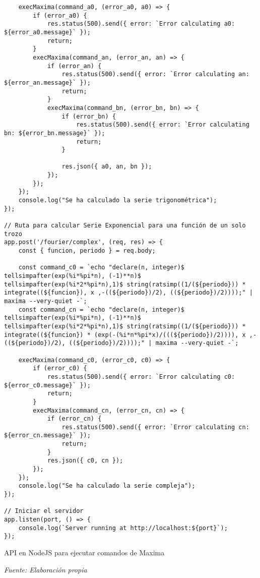 \begin{longlisting}
\begin{verbatim}
	execMaxima(command_a0, (error_a0, a0) => {
		if (error_a0) {
			res.status(500).send({ error: `Error calculating a0: ${error_a0.message}` });
			return;
		}
		execMaxima(command_an, (error_an, an) => {
			if (error_an) {
				res.status(500).send({ error: `Error calculating an: ${error_an.message}` });
				return;
			}
			execMaxima(command_bn, (error_bn, bn) => {
				if (error_bn) {
					res.status(500).send({ error: `Error calculating bn: ${error_bn.message}` });
					return;
				}
				
				res.json({ a0, an, bn });
			});
		});
	});
	console.log("Se ha calculado la serie trigonométrica");
});

// Ruta para calcular Serie Exponencial para una función de un solo trozo
app.post('/fourier/complex', (req, res) => {
	const { funcion, periodo } = req.body;
	
	const command_c0 = `echo "declare(n, integer)$ tellsimpafter(exp(%i*%pi*n), (-1)**n)$ tellsimpafter(exp(%i*2*%pi*n),1)$ string(ratsimp((1/(${periodo})) * integrate((${funcion}), x ,-((${periodo})/2), ((${periodo})/2))));" | maxima --very-quiet -`;
	const command_cn = `echo "declare(n, integer)$ tellsimpafter(exp(%i*%pi*n), (-1)**n)$ tellsimpafter(exp(%i*2*%pi*n),1)$ string(ratsimp((1/(${periodo})) * integrate((${funcion}) * (exp(-(%i*n*%pi*x)/(((${periodo})/2)))), x ,-((${periodo})/2), ((${periodo})/2))));" | maxima --very-quiet -`;
	
	execMaxima(command_c0, (error_c0, c0) => {
		if (error_c0) {
			res.status(500).send({ error: `Error calculating c0: ${error_c0.message}` });
			return;
		}
		execMaxima(command_cn, (error_cn, cn) => {
			if (error_cn) {
				res.status(500).send({ error: `Error calculating cn: ${error_cn.message}` });
				return;
			}
			res.json({ c0, cn });
		});
	});
	console.log("Se ha calculado la serie compleja");
});

// Iniciar el servidor
app.listen(port, () => {
	console.log(`Server running at http://localhost:${port}`);
});
	\end{verbatim}
\caption[API en NodeJS para ejecutar comandos de Maxima]{API en NodeJS para ejecutar comandos de Maxima} \textit{Fuente: Elaboración propia}
\end{longlisting}


